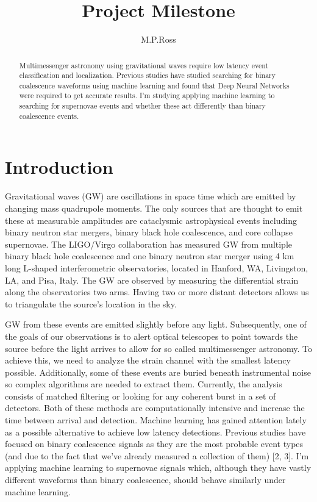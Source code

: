 \documentclass{article}
\title{Project Milestone}
\author{M.P.Ross}
\begin{document}
\maketitle

\begin{abstract}
Multimessenger astronomy using gravitational waves require low latency event classification and localization. Previous studies have studied searching for binary coalescence waveforms using machine learning and found that Deep Neural Networks were required to get accurate results. I'm studying applying machine learning to searching for supernovae events and whether these act differently than binary coalescence events.
\end{abstract}

\section{Introduction}
Gravitational waves (GW) are oscillations in space time which are emitted by changing mass quadrupole moments. The only sources that are thought to emit these at measurable amplitudes are cataclysmic astrophysical events including binary neutron star mergers, binary black hole coalescence, and core collapse supernovae. The LIGO/Virgo collaboration has measured GW from multiple binary black hole coalescence and one binary neutron star merger using 4 km long L-shaped interferometric observatories, located in Hanford, WA, Livingston, LA, and Pisa, Italy. The GW are observed by measuring the differential strain along the observatories two arms. Having two or more distant detectors allows us to triangulate the source's location in the sky. 

GW from these events are emitted slightly before any light. Subsequently, one of the goals of our observations is to alert optical telescopes to point towards the source before the light arrives to allow for so called multimessenger astronomy. To achieve this, we need to analyze the strain channel with the smallest latency possible. Additionally, some of these events are buried beneath instrumental noise so complex algorithms are needed to extract them. Currently, the analysis consists of matched filtering or looking for any coherent burst in a set of detectors. Both of these methods are computationally intensive and increase the time between arrival and detection. Machine learning has gained attention lately as a possible alternative to achieve low latency detections. Previous studies have focused on binary coalescence signals as they are the most probable event types (and due to the fact that we've already measured a collection of them) [2, 3]. I'm applying machine learning to supernovae signals which, although they have vastly different waveforms than binary coalescence, should behave similarly under machine learning.
\end{document}
